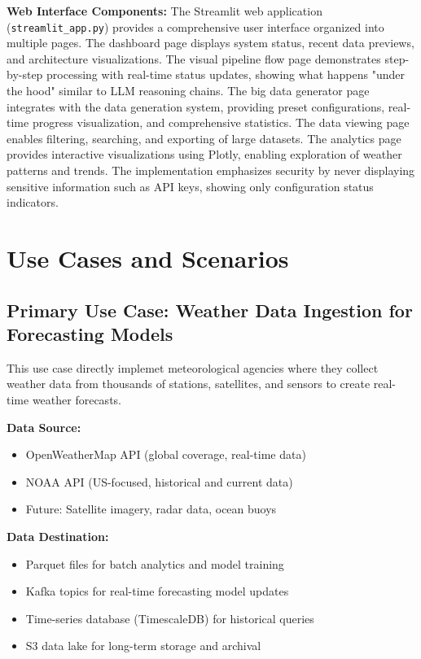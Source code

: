 \documentclass[12pt,a4paper]{article}
\begin{document}
\textbf{Web Interface Components:} The Streamlit web application (\texttt{streamlit\_app.py}) provides a comprehensive user interface organized into multiple pages. The dashboard page displays system status, recent data previews, and architecture visualizations. The visual pipeline flow page demonstrates step-by-step processing with real-time status updates, showing what happens "under the hood" similar to LLM reasoning chains. The big data generator page integrates with the data generation system, providing preset configurations, real-time progress visualization, and comprehensive statistics. The data viewing page enables filtering, searching, and exporting of large datasets. The analytics page provides interactive visualizations using Plotly, enabling exploration of weather patterns and trends. The implementation emphasizes security by never displaying sensitive information such as API keys, showing only configuration status indicators.

\newpage
\section{Use Cases and Scenarios}

\subsection{Primary Use Case: Weather Data Ingestion for Forecasting Models}

This use case directly implemet meteorological agencies where they collect weather data from thousands of stations, satellites, and sensors to create real-time weather forecasts.

\textbf{Data Source:}
\begin{itemize}
    \item OpenWeatherMap API (global coverage, real-time data)
    \item NOAA API (US-focused, historical and current data)
    \item Future: Satellite imagery, radar data, ocean buoys
\end{itemize}

\textbf{Data Destination:}
\begin{itemize}
    \item Parquet files for batch analytics and model training
    \item Kafka topics for real-time forecasting model updates
    \item Time-series database (TimescaleDB) for historical queries
    \item S3 data lake for long-term storage and archival
\end{itemize}
\end{document}
